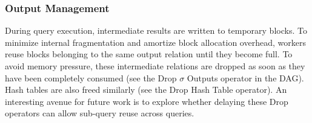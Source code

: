 \subsubsection{Output Management}
During query execution, intermediate results are written to temporary blocks. To minimize internal fragmentation and amortize block allocation overhead, workers reuse blocks belonging to the same output relation until they become full. To avoid memory pressure, these intermediate relations are dropped as soon as they have been completely consumed (see the Drop $\sigma$ Outputs operator in the DAG). Hash tables are also freed similarly (see the Drop Hash Table operator). An interesting avenue for future work is to explore whether delaying these Drop operators can allow sub-query reuse across queries.
%
%



